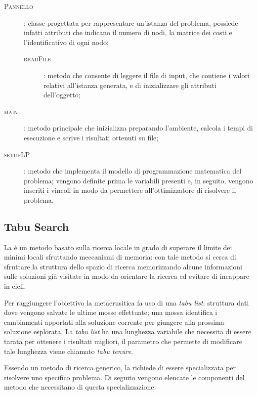 \begin{description}
	\item[\textsc{Pannello}]: classe progettata per rappresentare un'istanza del problema, possiede infatti attributi che indicano il numero di nodi, la matrice dei costi e l'identificativo di ogni nodo;
	\begin{description}
		\item[\textsc{readFile}]: metodo che consente di leggere il file di input, che contiene i valori relativi all'istanza generata, e di inizializzare gli attributi dell'oggetto;
	\end{description}
	\item[\textsc{main}]: metodo principale che inizializza  preparando l'ambiente, calcola i tempi di esecuzione e scrive i risultati ottenuti su file;
	\item[\textsc{setupLP}]: metodo che implementa il modello di programmazione matematica del problema; vengono definite prima le variabili presenti e, in seguito, vengono inseriti i vincoli in modo da permettere all'ottimizzatore di risolvere il problema.
\end{description}

\subsection{Tabu Search}
La \tabu è un metodo basato sulla ricerca locale in grado di superare il limite dei minimi locali sfruttando meccanismi di memoria: con tale metodo si cerca di sfruttare la struttura dello spazio di ricerca memorizzando alcune informazioni sulle soluzioni già visitate in modo da orientare la ricerca ed evitare di incappare in cicli.

Per raggiungere l'obiettivo la metaerusitica fa uso di una \emph{tabu list}: struttura dati dove vengono salvate le ultime mosse effettuate; una mossa identifica i cambiamenti apportati alla soluzione corrente per giungere alla prossima soluzione esplorata.
La \emph{tabu list} ha una lunghezza variabile che necessita di essere tarata per ottenere i risultati migliori, il parametro che permette di modificare tale lunghezza viene chiamato \emph{tabu tenure}.

Essendo un metodo di ricerca generico, la \tabu richiede di essere specializzata per risolvere uno specifico problema.
Di seguito vengono elencate le componenti del metodo che necessitano di questa specializzazione:

